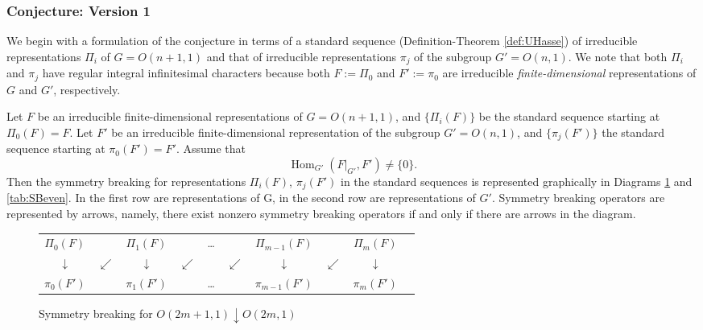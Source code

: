 \subsubsection{Conjecture: Version 1}
We begin with a formulation of the conjecture
 in terms of a standard sequence
 (Definition-Theorem \ref{def:UHasse})
 of irreducible representations $\Pi_i$ of $G=O(n+1,1)$
 and that of irreducible representations $\pi_j$ of the subgroup $G'=O(n,1)$.  
We note that both $\Pi_i$ and $\pi_j$ have
 regular integral infinitesimal characters
 because both $F:=\Pi_0$ and $F':=\pi_0$ are
 irreducible {\it{finite-dimensional}} representations of $G$
 and $G'$, respectively. 

\begin{conjecture}
\label{conj:GPver1}
Let $F$ be an irreducible finite-dimensional representations
 of $G=O(n+1,1)$,
 and 
$\{\Pi_i(F)\}$ be the standard sequence
 starting at $\Pi_0(F)=F$.  
Let $F'$ be an irreducible finite-dimensional representation of the subgroup $G'=O(n,1)$, 
 and $\{\pi_j(F')\}$ the standard sequence starting 
 at $\pi_0(F')=F'$.  
Assume that 
\[ 
   {\operatorname{Hom}}_{G'}(F|_{G'},F') \not = \{0\}.  
\]
Then the symmetry breaking for representations $\Pi_i(F)$, $\pi_j(F')$
 in the standard sequences  is represented graphically
 in Diagrams \ref{tab:SBodd} and \ref{tab:SBeven}. 
In the first row are representations of G, in the second row are representations of $G'$. 
Symmetry breaking operators are represented by arrows, 
 namely,
 there exist nonzero symmetry breaking operators
 if and only if there are arrows in the diagram.  
\end{conjecture}
\medskip

\begin{figure}[htp]
\color{black}
\caption{Symmetry breaking for $O(2m+1,1) \downarrow O(2m,1)$}
\begin{center}
\begin{tabular}{@{}c@{~}c@{~}c@{~}c@{~}c@{~}c@{~}c@{~}c@{~}c@{~}c@{}}
$\Pi_0(F)$
& 
&$\Pi_1(F)$
&  
&\dots
&
&$\Pi_{m-1}(F)$
& 
&$\Pi_{m}(F)$ 
\\
$\downarrow$ 
&$\swarrow$
& $\downarrow$
& $\swarrow$ 
& 
& $\swarrow$ 
& $ \downarrow $
&  $\swarrow $  
&  $\downarrow$ 
\\
$\pi_0(F')$& &$\pi_1(F')$
& 
&\dots 
&
& $\pi_{m-1}(F')$ 
& 
& $\pi_{m}(F')$ 
\end{tabular}
\end{center}
\label{tab:SBodd}
\end{figure}%

